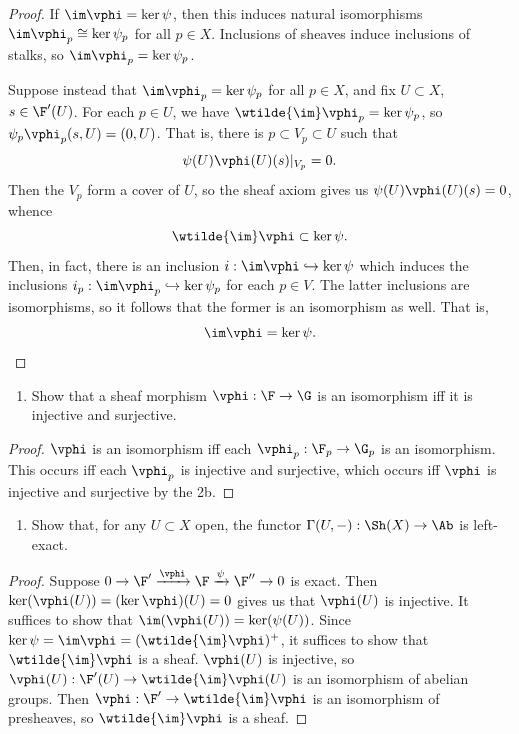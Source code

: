 \documentclass[12pt]{amsart}
\begin{document}
\begin{proof}
  If $\im\vphi=\ker\psi$, then this induces natural isomorphisms $\im\vphi_p\cong\ker\psi_p$ for all $p\in X$.
  Inclusions of sheaves induce inclusions of stalks, so $\im\vphi_p=\ker\psi_p$.

  Suppose instead that $\im\vphi_p=\ker\psi_p$ for all $p\in X$, and fix $U\subset X$, $s\in \F'(U)$.
  For each $p\in U$, we have $\wtilde{\im}\vphi_p= \ker\psi_p$, so $\psi_p\vphi_p(s,U)=(0,U)$.
  That is, there is $p\subset V_p\subset U$ such that 
  \[
    \psi(U)\vphi(U)(s)|_{V_p} =0.
  \]
  Then the $V_p$ form a cover of $U$, so the sheaf axiom gives us $\psi(U)\vphi(U)(s)=0$, whence
  \[
    \wtilde{\im}\vphi\subset \ker\psi.
  \] 
  Then, in fact, there is an inclusion $i:\im\vphi\hookrightarrow \ker\psi$ which induces the inclusions $i_p:\im\vphi_p\hookrightarrow\ker\psi_p$ for each $p\in V$.
  The latter inclusions are isomorphisms, so it follows that the former is an isomorphism as well.
  That is,
  \[
    \im\vphi=\ker\psi.
  \] 
\end{proof}

\begin{enumerate}
	\item[1.5.] {
      Show that a sheaf morphism $\vphi:\F\to\G$ is an isomorphism iff it is injective and surjective.
    }
\end{enumerate}

\begin{proof}
  $\vphi$ is an isomorphism iff each $\vphi_p:\F_p\to \G_p$ is an isomorphism. This occurs iff each $\vphi_p$ is injective and surjective, which occurs iff $\vphi$ is injective and surjective by the 2b.
\end{proof}

\begin{enumerate}
	\item[1.8.] {
      Show that, for any $U\subset X$ open, the functor $\Gamma(U,-):\Sh(X)\to \Ab$ is left-exact.
    }
\end{enumerate}

\begin{proof}
  Suppose $0\to \F'\xrightarrow{\vphi}\F\xrightarrow{\psi}\F''\to 0$ is exact.
  Then $\ker(\vphi(U)) = (\ker\vphi)(U)=0$ gives us that $\vphi(U)$ is injective. 
  It suffices to show that $\im(\vphi(U))=\ker(\psi(U))$.
  Since $\ker\psi =\im\vphi = (\wtilde{\im}\vphi)^+$, it suffices to show that $\wtilde{\im}\vphi$ is a sheaf.
  $\vphi(U)$ is injective, so $\vphi(U): \F'(U)\to \wtilde{\im}\vphi(U)$ is an isomorphism of abelian groups.
  Then $\vphi:\F'\to \wtilde{\im}\vphi$ is an isomorphism of presheaves, so $\wtilde{\im}\vphi$ is a sheaf.
\end{proof}
\end{document}
